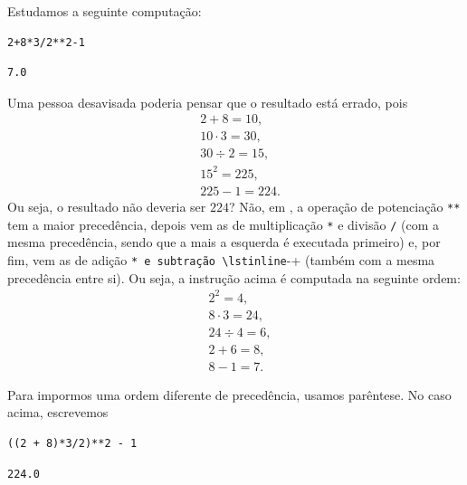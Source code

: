 \begin{ex}
  Estudamos a seguinte computação:

\begin{lstlisting}
2+8*3/2**2-1
\end{lstlisting}

\begin{verbatim}
7.0
\end{verbatim}

  Uma pessoa desavisada poderia pensar que o resultado está errado, pois
  \begin{align}
    & 2+8 = 10, \\
    & 10 \cdot 3 = 30, \\
    & 30 \div 2 = 15, \\
    & 15^2 = 225, \\
    & 225 - 1 = 224.
  \end{align}
  Ou seja, o resultado não deveria ser $224$? Não, em {\python}, a operação de potenciação \lstinline+**+ tem a maior precedência, depois vem as de multiplicação \lstinline+*+ e divisão \lstinline+/+ (com a mesma precedência, sendo que a mais a esquerda é executada primeiro) e, por fim, vem as de adição \lstinline*+* e subtração \lstinline+-+ (também com a mesma precedência entre si). Ou seja, a instrução acima é computada na seguinte ordem:
  \begin{align}
    & 2^2 = 4, \\
    & 8\cdot 3 = 24, \\
    & 24\div 4 = 6, \\
    & 2 + 6 = 8, \\
    & 8 - 1 = 7.
  \end{align}

  Para impormos uma ordem diferente de precedência, usamos parêntese. No caso acima, escrevemos

\begin{lstlisting}
((2 + 8)*3/2)**2 - 1
\end{lstlisting}

\begin{verbatim}
224.0
\end{verbatim}

\end{ex}

